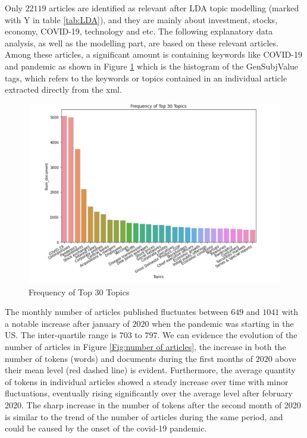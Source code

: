 \documentclass[a4paper, 12pt]{report}
\begin{document}
     Only $22119$ articles are identified as relevant after LDA topic modelling (marked with Y in table \ref{tab:LDA}), and they are mainly about investment, stocks, economy, COVID-19, technology and etc. The following explanatory data analysis, as well as the modelling part, are based on these relevant articles. Among these articles, a significant amount is containing keywords like COVID-19 and pandemic as shown in Figure \ref{Fig:topics} which is the histogram of the GenSubjValue tags, which refers to the keywords or topics contained in an individual article extracted directly from the xml.
     
    \begin{figure}[H]
    \includegraphics[width=15cm, height = 8cm]{graphs/topic_hist.PNG}
    \centering
    \caption{Frequency of Top 30 Topics}
    \label{Fig:topics}
    \end{figure}
    
    
    The monthly number of articles published fluctuates between $649$ and $1041$ with a notable increase after january of $2020$ when the pandemic was starting in the US. The inter-quartile range is $703$ to $797$. We can evidence the evolution of the number of articles in Figure \ref{Fig:number of articles}, the increase in both the number of tokens (words) and documents during the first months of $2020$ above their mean level (red dashed line) is evident. Furthermore, the average quantity of tokens in individual articles showed a steady increase over time with minor fluctuations, eventually rising significantly over the average level after february 2020. The sharp increase in the number of tokens after the second month of 2020 is similar to the trend of the number of articles during the same period, and could be caused by the onset of the covid-19 pandemic.
    
\end{document}
